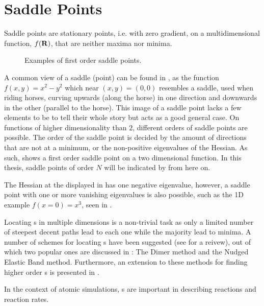 \section{Saddle Points}
\label{sec:sps}


Saddle points are stationary points, i.e. with zero gradient, on a multidimensional function, $f({\mathrm{\mathbf{\bm{R}}}})$, that are neither maxima nor minima.

\begin{figure}[h]
  \begin{center}
    \parbox{0.85\linewidth}{
      \caption{Examples of first order saddle points.
      }
      \label{fig:saddle-points}
    }
  \end{center}
\end{figure}

A common view of a saddle (point) can be found in , as the function $f(x, y) = x^2 - y^2$ which near $(x,y) = (0,0)$ resembles a saddle, used when riding horses, curving upwards (along the horse) in one direction and downwards in the other (parallel to the horse).
This image of a saddle point lacks a few elements to be to tell their whole story but acts as a good general case.
On functions of higher dimensionality than $2$, different orders of saddle points are possible.
The order of the saddle point is decided by the amount of directions that are not at a minimum, or the non-positive eigenvalues of the Hessian.
As such,  shows a first order saddle point on a two dimensional function.
In this thesis, saddle points of order $N$ will be indicated by  from here on.

The Hessian at the \sap{} displayed in  has one negative eigenvalue, however, a saddle point with one or more vanishing eigenvalues is also possible, such as the 1D example $f(x = 0) = x^3$, seen in .

Locating \sap{}s in multiple dimensions is a non-trivial task as only a limited number of steepest decent paths lead to each one while the majority lead to minima.
A number of schemes  for locating s have been suggested (see \cite{sp-mep-review-2002} for a reivew), out of which two popular ones are discussed in : The Dimer method and the Nudged Elastic Band method.
Furthermore, an extension to these methods for finding higher order \sap{}s is presented in .

In the context of atomic simulations, \sap{}s are important in describing reactions and reaction rates.
